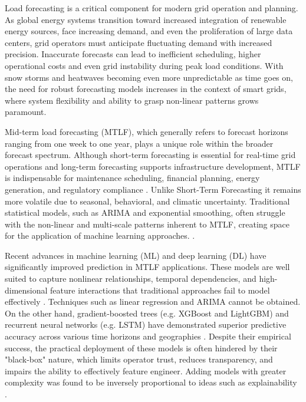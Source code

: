 \documentclass{ifacconf}
\begin{document}
Load forecasting is a critical component for modern grid operation and planning. As global energy systems transition toward increased integration of renewable energy sources, face increasing demand, and even the proliferation of large data centers, grid operators must anticipate fluctuating demand with increased precision. Inaccurate forecasts can lead to inefficient scheduling, higher operational costs and even grid instability during peak load conditions. With snow storms and heatwaves becoming even more unpredictable as time goes on, the need for robust forecasting models increases in the context of smart grids, where system flexibility and ability to grasp non-linear patterns grows paramount.

Mid-term load forecasting (MTLF), which generally refers to forecast horizons ranging from one week to one year, plays a unique role within the broader forecast spectrum. Although short-term forecasting is essential for real-time grid operations and long-term forecasting supports infrastructure development, MTLF is indispensable for maintenance scheduling, financial planning, energy generation, and regulatory compliance \cite{yin2023mid}. Unlike Short-Term Forecasting it remains more volatile  due to seasonal, behavioral, and climatic uncertainty. Traditional statistical models, such as ARIMA and exponential smoothing, often struggle with the non-linear and multi-scale patterns inherent to MTLF, creating space for the application of machine learning approaches. \cite{ghiassi2006medium, yin2023mid}.

Recent advances in machine learning (ML) and deep learning (DL) have significantly improved prediction in MTLF applications. These models are well suited to capture nonlinear relationships, temporal dependencies, and high-dimensional feature interactions that traditional approaches fail to model effectively \cite{yin2023mid, waheed2024empowering}. Techniques such as linear regression and ARIMA cannot be obtained. On the other hand, gradient-boosted trees (e.g. XGBoost and LightGBM) and recurrent neural networks (e.g. LSTM) have demonstrated superior predictive accuracy across various time horizons and geographies \cite{waheed2024empowering, ghiassi2006medium}. Despite their empirical success, the practical deployment of these models is often hindered by their "black-box" nature, which limits operator trust, reduces transparency, and impairs the ability to effectively feature engineer. Adding models with greater complexity was found to be inversely proportional to ideas such as explainability \cite{baur2024explainability}.
\end{document}
